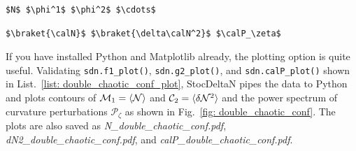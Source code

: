 \documentclass[aps, prd
, preprint
, nofootinbib 
, notitlepage
, superscriptaddress
, longbibliography
]{revtex4-1}
\newcommand{\calC}{\mathcal{C}}
\newcommand{\calM}{\mathcal{M}}
\newcommand{\calN}{\mathcal{N}}
\newcommand{\calP}{\mathcal{P}}
\begin{document}
\begin{lstlisting}[numbers = none, mathescape, caption={\textit{traj\_}$\braket{\text{model name}}$\textit{.dat} : trajectory data of one sample path}, 
label = list: traj_double_chaotic_conf.dat]
$N$ $\phi^1$ $\phi^2$ $\cdots$
\end{lstlisting}

\begin{lstlisting}[numbers = none, mathescape, caption={\textit{calP\_}$\braket{\text{model name}}$\textit{.dat} : data related to curvature perturbation}, 
label = list: calP_double_chaotic_conf.dat]
$\braket{\calN}$ $\braket{\delta\calN^2}$ $\calP_\zeta$
\end{lstlisting}

If you have installed Python and Matplotlib already, the plotting option is quite useful.
Validating \texttt{sdn.f1\_plot()}, \texttt{sdn.g2\_plot()}, and \texttt{sdn.calP\_plot()} shown in List.~\ref{list: double_chaotic_conf_plot},
StocDeltaN pipes the data to Python and plots contours of $\calM_1=\braket{\calN}$ and $\calC_2=\braket{\delta\calN^2}$ 
and the power spectrum of curvature perturbations $\calP_\zeta$ as shown in
Fig.~\ref{fig: double_chaotic_conf}. The plots are also saved as \textit{N\_double\_chaotic\_conf.pdf}, \textit{dN2\_double\_chaotic\_conf.pdf}, and
\textit{calP\_double\_chaotic\_conf.pdf}.
\end{document}
